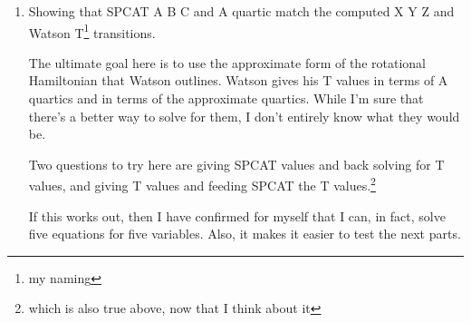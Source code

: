 \documentclass[12pt]{article}
\renewcommand{\,}{\textsuperscript{,}}
\begin{document}
\begin{enumerate}
\begin{itemize}
This step is the first one. Using the same numbers, do we get the same outputs?

\item Showing that SPCAT A B C and A reduction match the computed A B C (Non-A reduced Values converted into A reduction) and A distortion.

Once we've shown we can use A(A) B(A) and C(A), use Watson's conversion from A to A(A) and etc.

\item Showing that SPCAT A B C and A reduction match the computed X Y Z (real values, converted to A reduction) and A distortion.

Once we've shown we can convert A to A(A), make sure we can do all six versions of X to A(A)  
\end{itemize}

Since realistically, I don't really want to manually compute these values, I'm likely going to have to trust that the values are as linearly interconvertible as I remember that they should be.  
In practice, this calculation is way more computationally expensive, because the Hamiltonian gets much more complex.  
Then again, since it remains a numeric matrix, computers do, in fact, go brrr.

Assuming that I get this, I have more or less proved to myself that SPCAT and real Hamiltonians result in the same transitions.\footnote{and if they don't, I am very concerned, because they REALLY should, or someone else in the field should've caught it in the last three decades}

\item Showing that SPCAT A B C and A quartic match the computed X Y Z and Watson T\footnote{my naming} transitions.

The ultimate goal here is to use the approximate form of the rotational Hamiltonian that Watson outlines.  
Watson gives his T values in terms of A quartics and in terms of the approximate quartics.  
While I'm sure that there's a better way to solve for them, I don't entirely know what they would be.

Two questions to try here are giving SPCAT values and back solving for T values, and giving T values and feeding SPCAT the T values.\footnote{which is also true above, now that I think about it}

If this works out, then I have confirmed for myself that I can, in fact, solve five equations for five variables.  
Also, it makes it easier to test the next parts.


\end{enumerate}
\end{document}
